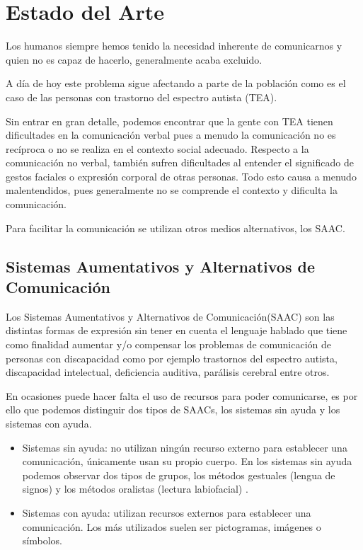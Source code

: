 \chapter{Estado del Arte}
\label{cap:estadoDeLaCuestion}


Los humanos siempre  hemos tenido la necesidad inherente de comunicarnos y quien no es capaz de hacerlo, generalmente acaba excluido.

A día de hoy este problema sigue afectando a parte de la población como es el caso de las personas con trastorno del espectro autista (TEA).

Sin entrar en gran detalle, podemos encontrar que la gente con TEA tienen dificultades en la comunicación verbal pues a menudo la comunicación no es recíproca o no se realiza en el contexto social adecuado. Respecto a la comunicación no verbal, también sufren dificultades al entender el significado de gestos faciales o expresión corporal de otras personas. Todo esto causa a menudo malentendidos, pues generalmente no se comprende el contexto y dificulta la comunicación. 

Para facilitar la comunicación se utilizan otros medios alternativos, los SAAC.

\section{Sistemas Aumentativos y Alternativos de Comunicación}
Los Sistemas Aumentativos y Alternativos de Comunicación(SAAC) son las distintas formas de expresión sin tener en cuenta el lenguaje hablado que tiene como finalidad aumentar y/o compensar los problemas de comunicación de personas con discapacidad como por ejemplo trastornos del espectro autista, discapacidad intelectual, deficiencia auditiva, parálisis cerebral entre otros.

En ocasiones puede hacer falta el uso de recursos para poder comunicarse, es por ello que podemos distinguir dos tipos de SAACs, los sistemas sin ayuda y los sistemas con ayuda.
\newpage
\begin{itemize}
	\item Sistemas sin ayuda: no utilizan ningún recurso externo para establecer una comunicación, únicamente usan su propio cuerpo. En los sistemas sin ayuda podemos observar dos tipos de grupos, los métodos gestuales (lengua de signos) y los métodos oralistas (lectura labiofacial) . 
	\item Sistemas con ayuda: utilizan recursos externos para establecer una comunicación. Los más utilizados suelen ser pictogramas, imágenes o símbolos.
\end{itemize}

